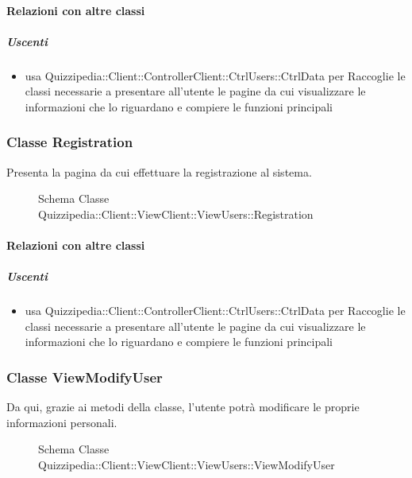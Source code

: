 \paragraph{Relazioni con altre classi}
\subparagraph{Uscenti}
\begin{itemize}
\item usa Quizzipedia::Client::ControllerClient::CtrlUsers::CtrlData per Raccoglie le classi necessarie a presentare all'utente le pagine da cui visualizzare le informazioni che lo riguardano e compiere le funzioni principali
\end{itemize}
\subsubsection{Classe Registration}
Presenta la pagina da cui effettuare la  registrazione al sistema.
\begin{figure}[H]
\centering
\noindent{}
\caption[Schema Classe Registration]{Schema Classe Quizzipedia::Client::ViewClient::ViewUsers::Registration}
\end{figure}
\paragraph{Relazioni con altre classi}
\subparagraph{Uscenti}
\begin{itemize}
\item usa Quizzipedia::Client::ControllerClient::CtrlUsers::CtrlData per Raccoglie le classi necessarie a presentare all'utente le pagine da cui visualizzare le informazioni che lo riguardano e compiere le funzioni principali
\end{itemize}
\subsubsection{Classe ViewModifyUser}
Da qui, grazie ai metodi della classe, l'utente potrà modificare le proprie informazioni personali.
\begin{figure}[H]
\centering
\noindent{}
\caption[Schema Classe ViewModifyUser]{Schema Classe Quizzipedia::Client::ViewClient::ViewUsers::ViewModifyUser}
\end{figure}

